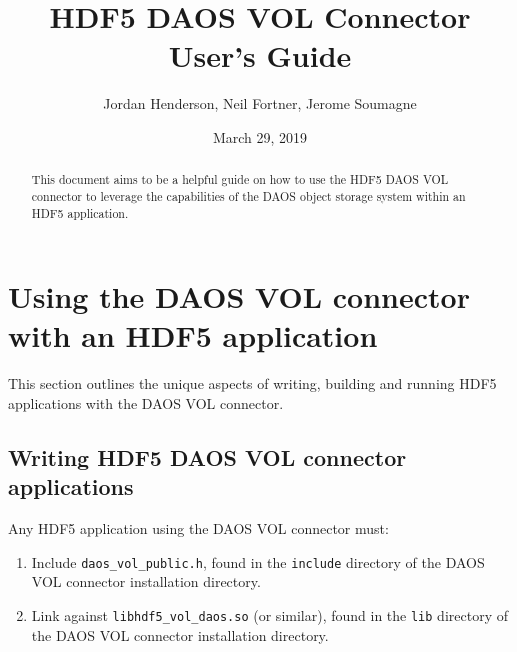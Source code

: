 \documentclass[12pt]{THG_Guide}
\title{\textbf{HDF5 DAOS VOL Connector User's Guide}}
\author{Jordan Henderson, Neil Fortner, Jerome Soumagne}
\date{March 29, 2019}
\begin{document}
\maketitle




\begin{abstract}
This document aims to be a helpful guide on how to use the HDF5 DAOS VOL connector to leverage the capabilities of the DAOS object storage system within an HDF5 application.
\end{abstract}






\tableofcontents
\newpage


\section{Using the DAOS VOL connector with an HDF5 application}

This section outlines the unique aspects of writing, building and running HDF5 applications with the DAOS VOL connector.

\subsection{Writing HDF5 DAOS VOL connector applications}

Any HDF5 application using the DAOS VOL connector must:

\begin{enumerate}
    \item Include \texttt{daos\_vol\_public.h}, found in the \texttt{include} directory of the DAOS VOL connector installation directory.
    \item Link against \texttt{libhdf5\_vol\_daos.so} (or similar), found in the \texttt{lib} directory of the DAOS VOL connector installation directory.
\end{enumerate}
\end{document}

